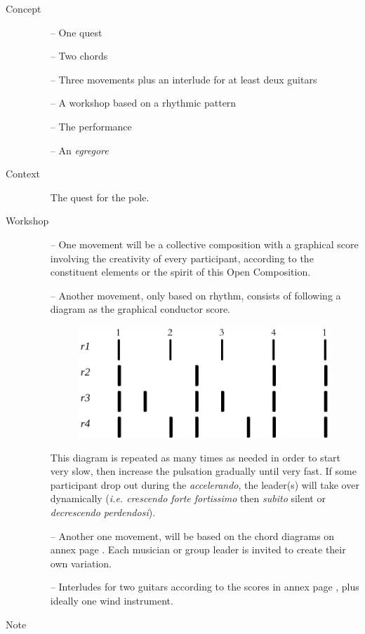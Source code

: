 \begin{description}
\item[Concept] \hfill 
\begin{itemize}
\item[--] One quest
\item[--] Two chords
\item[--] Three movements plus an interlude for at least deux guitars
\item[--] A workshop based on a rhythmic pattern
\item[--] The performance
\item[--] An \textit{egregore}
\end{itemize}
\bigskip
\item[Context] \hfill 
\begin{itemize}
\item[] The quest for the pole.
\end{itemize}
\bigskip
\item[Workshop] \hfill 
\begin{itemize}
\item[--] One movement will be a collective composition with a graphical score involving the creativity of every participant, according to the constituent elements or the spirit of this Open Composition.  
\item[--] Another movement, only based on rhythm, consists of following a diagram as the graphical conductor score. 
 \begin{figure}[H]
\begin{center}
\includegraphics[scale=0.3]{img/nrtm}
\end{center}
\end{figure}
This diagram %
is repeated as many times as needed in order to start very slow, then increase the pulsation gradually until very fast. If some participant drop out during the \textit{accelerando}, the leader(s) will take over dynamically (\textit{i.e. crescendo forte fortissimo} then \textit{subito} silent or \textit{decrescendo perdendosi}).
\item[--] Another one movement, will be based on the chord diagrams on annex page \pageref{oco2}. Each musician or group leader is invited to create their own variation.
\item[--] Interludes for two guitars according to the scores in annex page \pageref{interlude}, plus ideally one wind instrument.
\end{itemize}
\bigskip
\item[Note] \hfill 


\end{description}
